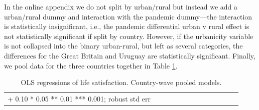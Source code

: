 \documentclass[10pt, letterpaper]{article}
\begin{document}
\begin{spacing}{1.4}
In the online appendix we do not split by urban/rural but instead we add a urban/rural dummy
and interaction with the pandemic dummy---the interaction is statistically insignificant, i.e., the pandemic differential urban v rural effect is not statistically significant if split by country. However, if the urbanicity variable is not collapsed into the binary urban-rural, but left as several categories, the differences for the Great Britain and Uruguay are statistically significant. 
Finally, we pool data for the three countries together in Table
\ref{d}.
 


\begin{spacing}{.9} \begin{table}[H]\centering   \begin{scriptsize} \begin{tabular}{p{1.8in}p{.5in}p{.5in}p{.5in}p{.5in}p{.5in}p{.5in}p{.5in}p{.5in}p{.5in}p{.5
                                                                      in}p{.5in}p{.5
                                                                      in}}\hline
                                                                      
                                                                      \hline +
                                                                      0.10 *
                                                                      0.05 **
                                                                      0.01 ***
                                                                      0.001;
                                                                      robust std
                                                                      err \end{tabular}\end{scriptsize}\caption{\label{d}OLS
                                                                    regressions
                                                                    of life
                                                                    satisfaction. Country-wave
                                                                  pooled models.}\end{table} \end{spacing}


\end{spacing}
\end{document}
